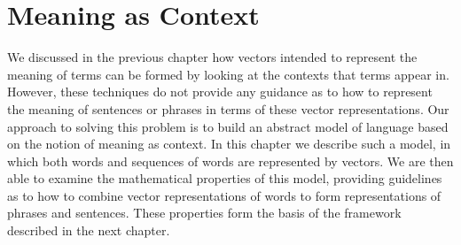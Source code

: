 
%

%

\chapter{Meaning as Context}

We discussed in the previous chapter how vectors intended to represent the meaning of terms can be formed by looking at the contexts that terms appear in. However, these techniques do not provide any guidance as to how to represent the meaning of sentences or phrases in terms of these vector representations. Our approach to solving this problem is to build an abstract model of language based on the notion of meaning as context. In this chapter we describe such a model, in which both words and sequences of words are represented by vectors. We are then able to examine the mathematical properties of this model, providing guidelines as to how to combine vector representations of  words to form representations of phrases and sentences. These properties form the basis of the framework described in the next chapter.


